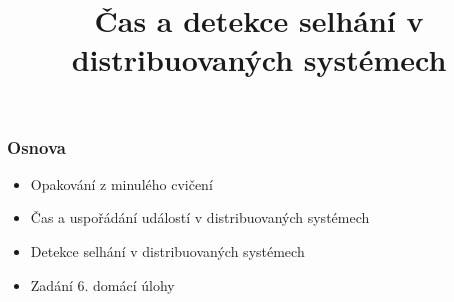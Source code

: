 \documentclass[usenames,dvipsnames,9pt]{beamer}
\title{Čas a detekce selhání v distribuovaných systémech}
\date{}
\institute{B4B36PDV -- Paralelní a distribuované výpočty}
\begin{document}
\maketitle

\begin{frame}
  \frametitle{Osnova}
  \begin{itemize}
    \item Opakování z minulého cvičení\\[1.5em]
    \item Čas a uspořádání událostí v distribuovaných systémech
    \item Detekce selhání v distribuovaných systémech\\[1.5em]
    \item Zadání 6. domácí úlohy
  \end{itemize}
\end{frame}
\end{document}
